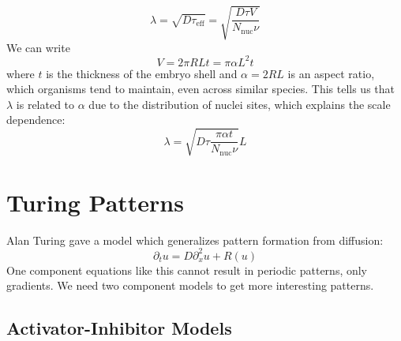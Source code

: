 \documentclass[a4paper,twoside,master.tex]{subfiles}
\begin{document}
\begin{equation}
    \lambda = \sqrt{D \tau_{\text{eff}}} = \sqrt{\frac{D \tau V}{N_{\text{nuc}} \nu}}
\end{equation}
We can write
\begin{equation}
    V = 2 \pi R L t = \pi \alpha L^2 t
\end{equation}
where $ t $ is the thickness of the embryo shell and $ \alpha = 2RL $ is an aspect ratio, which organisms tend to maintain, even across similar species. This tells us that $ \lambda $ is related to $ \alpha $ due to the distribution of nuclei sites, which explains the scale dependence:
\begin{equation}
    \lambda = \sqrt{D \tau \frac{\pi \alpha t}{N_{\text{nuc}} \nu}} L
\end{equation}

\section{Turing Patterns}\label{sec:turing_patterns}

Alan Turing gave a model which generalizes pattern formation from diffusion:
\begin{equation}
    \partial_t u = D \partial_x^2 u + R(u)
\end{equation}
One component equations like this cannot result in periodic patterns, only gradients. We need two component models to get more interesting patterns.

\subsection{Activator-Inhibitor Models}\label{sub:activator-inhibitor_models}
\end{document}
